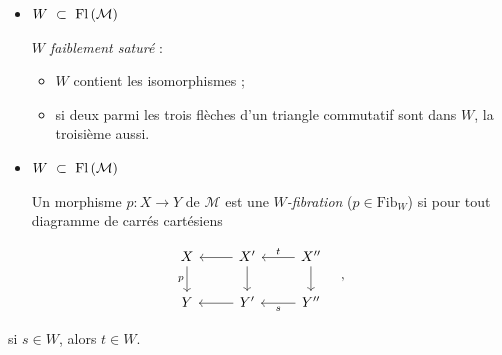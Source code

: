 \begin{itemize}
\item $W \ \subset\ \Fl(\mathcal{M})$

\textit{$W$ faiblement saturé} :
\begin{itemize}
\item[a)] $W$ contient les isomorphismes ;
\item[b)] si deux parmi les trois flèches d'un triangle commutatif sont dans $W$, la troisième aussi.
\end{itemize}

\item $W \ \subset\ \Fl(\mathcal{M})$

Un morphisme $p : X \longrightarrow Y$ de $\mathcal{M}$ est une \textit{$W$-fibration} ($p \in \mathrm{Fib}_W$) si pour tout diagramme de carrés cartésiens
\end{itemize}


\[
\begin{tikzcd}
X \arrow[d, "p"'] & X' \arrow[l] \arrow[d] & X'' \arrow[l, "t"'] \arrow[d] \\
Y & Y' \arrow[l] & Y'' \arrow[l, "s"]
\end{tikzcd}
\quad ,
\]

si $s \in W$, alors $t \in W$.

